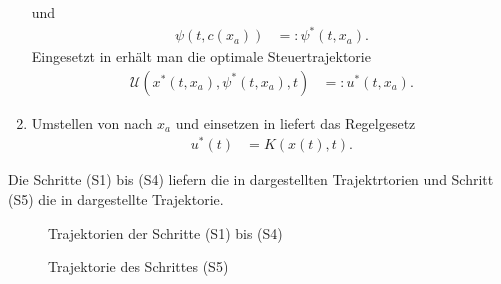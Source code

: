 \begin{enumerate}[label=(S\arabic*)]
  und 
  \begin{align*}
  	\psi\left(t,c(x_a) \right) & =: \psi^{\ast}(t,x_a).
  \end{align*}
  Eingesetzt in  erhält man die optimale Steuertrajektorie
  \begin{align}
  	\mathcal{U}\left(x^{\ast}(t,x_a), \psi^{\ast}(t,x_a),t \right) & =: u^{\ast}(t,x_a).	\label{eqn:kap_2_vor_optlsg_s5}
  \end{align}
  \item Umstellen von  nach $x_a$ und einsetzen in  liefert das Regelgesetz
  \begin{align*}
  	u^{\ast}(t) & = K\left(x(t),t \right).
  \end{align*}
\end{enumerate}
Die Schritte (S1) bis (S4) liefern die in  dargestellten Trajektrtorien und Schritt (S5) die in
 dargestellte Trajektorie.
\begin{figure}[htb]
	\centering
	
	\caption{Trajektorien der Schritte (S1) bis (S4)}
	\label{fig:kap_2_vor_optlsg_s1s4}
\end{figure}
\begin{figure}[htb]
	\centering
	
	\caption{Trajektorie des Schrittes (S5)}
	\label{fig:kap_2_vor_optlsg_s5}
\end{figure}
